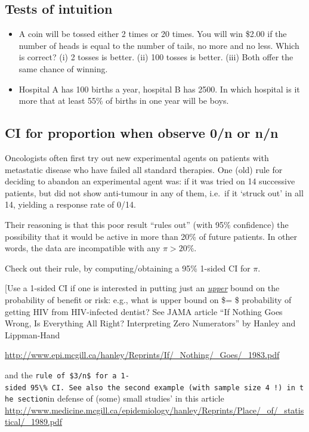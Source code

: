 \documentclass[]{book}
\begin{document}
\hypertarget{tests-of-intuition}{%
\subsection{Tests of intuition}\label{tests-of-intuition}}

\begin{itemize}
\item
  A coin will be tossed either 2 times or 20 times. You will win \$2.00 if the number of heads is equal to the number of tails, no more and no less. Which is correct? (i) 2 tosses is better. (ii) 100 tosses is better. (iii) Both offer the same chance of winning.
\item
  Hospital A has 100 births a year, hospital B has 2500. In which hospital is it more that at least 55\% of births in one year will be boys.
\end{itemize}

\hypertarget{ci-for-proportion-when-observe-0n-or-nn}{%
\subsection{CI for proportion when observe 0/n or n/n}\label{ci-for-proportion-when-observe-0n-or-nn}}

Oncologists often first try out new experimental agents on patients with metastatic disease who have failed all standard therapies.
One (old) rule for deciding to abandon an experimental agent was: if it was tried on 14 successive patients, but did not show anti-tumour in any of them, i.e.~if it `struck out' in all 14, yielding a response rate of 0/14.

Their reasoning is that this poor result ``rules out'' (with 95\% confidence) the possibility that it would be active in more than 20\% of future patients.
In other words, the data are incompatible with any \(\pi > 20\%.\)

Check out their rule, by computing/obtaining a 95\% 1-sided CI for \(\pi.\)

{[}Use a 1-sided CI if one is interested in putting just an \textit{\underline{upper}} bound on the probability of benefit or risk: e.g., what is upper bound on \$\pi = \$ probability of getting HIV from HIV-infected dentist? See JAMA article
``If Nothing Goes Wrong, Is Everything All Right? Interpreting Zero Numerators'' by Hanley and Lippman-Hand

\url{http://www.epi.mcgill.ca/hanley/Reprints/If/_Nothing/_Goes/_1983.pdf}

and the \texttt{rule\ of\ \$3/n\$\textquotesingle{}\ for\ a\ 1-sided\ 95\textbackslash{}\%\ CI.\ See\ also\ the\ second\ example\ (with\ sample\ size\ 4\ !)\ in\ the\ section}in defense of (some) small studies'
in this article
\url{http://www.medicine.mcgill.ca/epidemiology/hanley/Reprints/Place/_of/_statistical/_1989.pdf}
\end{document}
